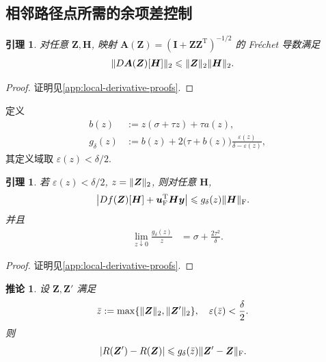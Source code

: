 \documentclass{ctexart}
\newcommand{\q}{\quad}
\newcommand{\T}{\mathrm{T}}
\newcommand{\dt}{\delta}
\renewcommand{\le}{\leqslant}
\DeclarePairedDelimiter\norm{\lVert}{\rVert}
\DeclarePairedDelimiter\abs{\lvert}{\rvert}
\newtheorem{lemma}[theorem]{引理}
\newtheorem{corollary}[theorem]{推论}
\begin{document}
\subsection{相邻路径点所需的余项差控制}
\label{subsec:local-remainder-lipschitz}

\begin{lemma}
\label{lem:normalization-derivative}
对任意 $\bm Z,\bm H$, 映射
$\bm A(\bm Z)=(\bm I+\bm Z\bm Z^\T)^{-1/2}$ 的 Fr\'echet 导数满足
\begin{align}
    \norm{D\bm A(\bm Z)[\bm H]}_2
    &\le \norm{\bm Z}_2\norm{\bm H}_2.
    \label{eq:normalization-derivative-bound}
\end{align}
\end{lemma}

\begin{proof}
证明见\cref{app:local-derivative-proofs}.
\end{proof}

定义
\begin{align}
    b(z)&:=z(\sigma+\tau z)+\tau a(z),
    \label{eq:local-b-definition}\\
    g_\dt(z)&:=b(z)
      +2\bigl(\tau+b(z)\bigr)
       \frac{\varepsilon(z)}{\dt-\varepsilon(z)},
    \label{eq:local-g-definition}
\end{align}
其定义域取 $\varepsilon(z)<\dt/2$.

\begin{lemma}
\label{lem:local-derivative-remainder}
若 $\varepsilon(z)<\dt/2$, $z=\norm{\bm Z}_2$, 则对任意 $\bm H$,
\begin{align}
    \abs*{Df(\bm Z)[\bm H]+\bm u_{\mathrm F}^\T\bm H\bm y}
    &\le g_\dt(z)\norm{\bm H}_{\mathrm F}.
    \label{eq:local-derivative-remainder}
\end{align}
并且
\begin{align}
    \lim_{z\downarrow0}\frac{g_\dt(z)}{z}
    &=\sigma+\frac{2\tau^2}{\dt}.
    \label{eq:local-g-asymptotic}
\end{align}
\end{lemma}

\begin{proof}
证明见\cref{app:local-derivative-proofs}.
\end{proof}

\begin{corollary}
\label{cor:local-remainder-difference}
设 $\bm Z,\bm Z'$ 满足
\begin{align}
    \bar z&:=\max\{\norm{\bm Z}_2,\norm{\bm Z'}_2\},\q
    \varepsilon(\bar z)<\frac\dt2.
    \label{eq:local-segment-domain}
\end{align}
则
\begin{align}
    \abs*{R(\bm Z')-R(\bm Z)}
    &\le g_\dt(\bar z)\norm{\bm Z'-\bm Z}_{\mathrm F}.
    \label{eq:local-remainder-difference}
\end{align}
\end{corollary}
\end{document}
